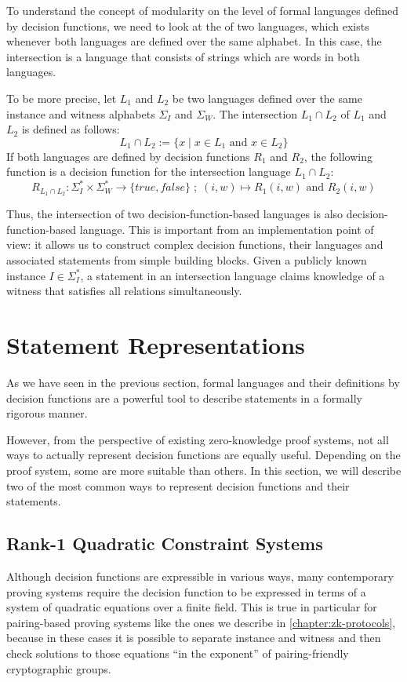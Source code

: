 To understand the concept of modularity on the level of formal languages defined by decision functions, we need to look at the  of two languages, which exists whenever both languages are defined over the same alphabet. In this case, the intersection is a language that consists of strings which are words in both languages. 

To be more precise, let $L_1$ and $L_2$ be two languages defined over the same instance and witness alphabets $\Sigma_I$ and $\Sigma_W$.  The intersection $L_1 \cap L_2$ of $L_1$ and $L_2$ is defined as follows:
\begin{equation}
L_1 \cap L_2 := \{x\;|\; x\in L_1 \text{ and } x\in L_2\}
\end{equation} 
If both languages are defined by decision functions $R_1$ and $R_2$, the following function is a decision function for the intersection language $L_1 \cap L_2$:
\begin{equation}
R_{L_1 \cap L_2}: \Sigma_I^* \times \Sigma_W^* \to \{true, false\}\;;\;
(i,w) \mapsto R_1(i,w) \text{ and } R_2(i,w)
\end{equation}

Thus, the intersection of two decision-function-based languages is also decision-function-based language. This is important from an implementation point of view: it allows us to construct complex decision functions, their languages and associated statements from simple building blocks. Given a publicly known instance $I\in \Sigma_I^*$, a statement in an intersection language claims knowledge of a witness that satisfies all relations simultaneously. 

\section{Statement Representations}\label{sec:statement-representations}
As we have seen in the previous section, formal languages and their definitions by decision functions are a powerful tool to describe statements in a formally rigorous manner. 

However, from the perspective of existing zero-knowledge proof systems, not all ways to actually represent decision functions are equally useful. Depending on the proof system, some are more suitable than others. In this section, we will describe two of the most common ways to represent decision functions and their statements.
\subsection{Rank-1 Quadratic Constraint Systems}
\label{sec:R1CS}
Although decision functions are expressible in various ways, many contemporary proving systems require the decision function to be expressed in terms of a system of quadratic equations over a finite field. This is true in particular for pairing-based proving systems like the ones we describe in \chaptname{}  \ref{chapter:zk-protocols}, because in these cases it is possible to separate instance and witness and then check solutions to those equations ``in the exponent'' of pairing-friendly cryptographic groups.

